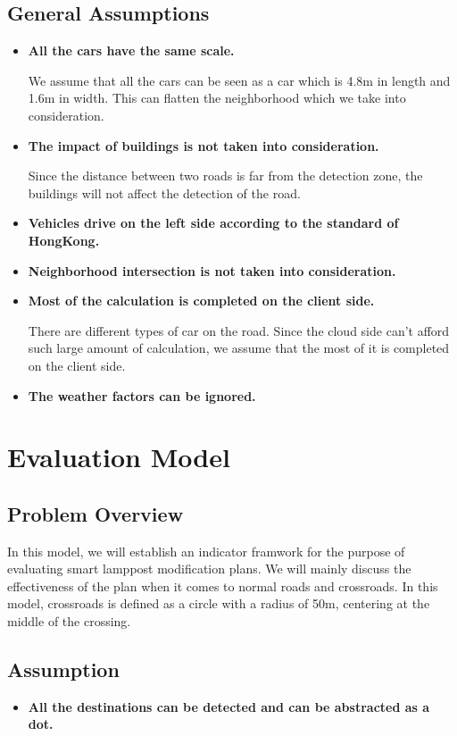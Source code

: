 \documentclass[12pt]{article}
\theoremstyle{definition}
\theoremstyle{remark}
\numberwithin{equation}{section}
\begin{document}
		\subsection{General Assumptions}
		\begin{itemize}
			\item \textbf{All the cars have the same scale.}
			
			We assume that all the cars can be seen as a car which is 4.8m in length and 1.6m in width. This can flatten the neighborhood which we take into consideration.
			\item \textbf{The impact of buildings is not taken into consideration.}
			
			Since the distance between two roads is far from the detection zone, the buildings will not affect the detection of the road.
			\item \textbf{Vehicles drive on the left side according to the standard of HongKong.}
			\item \textbf{Neighborhood intersection is not taken into consideration.}
			\item \textbf{Most of the calculation is completed on the client side.}
			
			There are different types of car on the road. Since the cloud side can't afford such large amount of calculation, we assume that the most of it is completed on the client side.
			\item \textbf{The weather factors can be ignored.}
			\end{itemize}
	
	\newpage
	\section{Evaluation Model}	
		\subsection{Problem Overview}
		In this model, we will establish an indicator framwork for the purpose of evaluating smart lamppost modification plans. We will mainly discuss the effectiveness of the plan when it comes to normal roads and crossroads. In this model, crossroads is defined as a circle with a radius of 50m, centering at the middle of the crossing.
		\subsection{Assumption}
		\begin{itemize}
			\item \textbf{All the destinations can be detected and can be abstracted as a dot.}
		\end{itemize}
\end{document}
